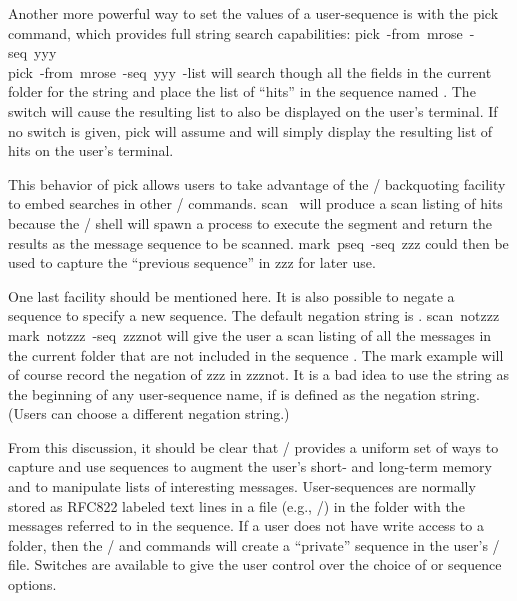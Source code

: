 Another more powerful way to set the values of a user-sequence is with
the pick command, which provides full string search capabilities:
\example pick\ -from\ mrose\ -seq\ yyy\\
	 pick\ -from\ mrose\ -seq\ yyy\ -list\endexample
will search though all the  fields in the current folder for the
string  and place the list of ``hits''
in the sequence named .
The  switch will cause the resulting list to also be displayed on
the user's terminal.
If no  switch is given,
pick will assume 
and will simply display the resulting list of hits on the user's terminal.

This  behavior of pick allows users to take advantage of the
\unix/ backquoting facility to embed searches in other \MH/ commands.
\example scan\ \endexample
will produce a scan listing of  hits because the
\unix/ shell will spawn a process to execute the
 segment and return the 
results as the message sequence to be scanned.
\example mark\ pseq\ -seq\ zzz\endexample
could then be used to capture the ``previous sequence'' in zzz for later use.

One last facility should be mentioned here.
It is also possible to negate a sequence to specify a new sequence.
The default negation string is .
\example scan\ notzzz\\
	 mark\ notzzz\ -seq\ zzznot\endexample
will give the user a scan listing of all the messages in the current folder
that are not included in the sequence .
The mark example will of course record the negation of zzz in zzznot.
It is a bad idea to use the string  as the beginning of any
user-sequence name,
if  is defined as the negation string.
(Users can choose a different negation string.)

From this discussion,
it should be clear that \MH/ provides a uniform set of ways to capture
and use sequences to augment the user's short- and long-term
memory and to manipulate lists of interesting messages.
User-sequences are normally stored as RFC822 labeled text lines in a file
(e.g., \sequences/)
in the folder with the messages referred to in the sequence.
If a user does not have write access to a folder,
then the \MH/  and  commands will
create a ``private'' sequence in the user's \context/ file.
Switches are available to give the user control over
the choice of  or  sequence options.

